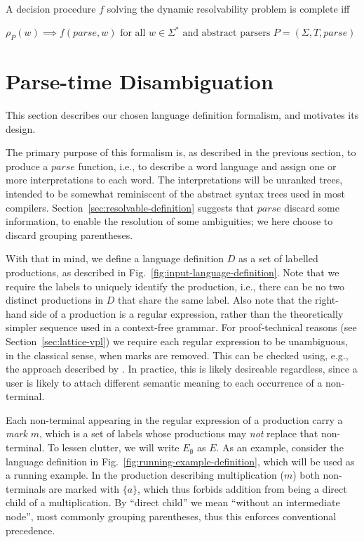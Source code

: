 \documentclass[acmsmall,review,anonymous]{acmart}\settopmatter{printfolios=true,printccs=false,printacmref=false}
\newcommand{\T}{\Sigma} %
\newcommand{\parse}{\mathit{parse}} %
\begin{document}
\begin{definition}
  A decision procedure $f$ solving the dynamic resolvability problem is complete iff

  $\rho_P(w) \implies f(\parse, w) \text{ for all } w \in \Sigma^{*} \text{ and abstract parsers } P = (\T, T, \parse)$
\end{definition}


\section{Parse-time Disambiguation} \label{sec:parse-time-disambiguation}

This section describes our chosen language definition formalism, and motivates its design.

The primary purpose of this formalism is, as described in the previous section, to produce a $\parse$ function, i.e., to describe a word language and assign one or more interpretations to each word. The interpretations will be unranked trees, intended to be somewhat reminiscent of the abstract syntax trees used in most compilers. Section~\ref{sec:resolvable-definition} suggests that $\parse$ discard some information, to enable the resolution of some ambiguities; we here choose to discard grouping parentheses.

With that in mind, we define a language definition $D$ as a set of labelled productions, as described in Fig.~\ref{fig:input-language-definition}. Note that we require the labels to uniquely identify the production, i.e., there can be no two distinct productions in $D$ that share the same label. Also note that the right-hand side of a production is a regular expression, rather than the theoretically simpler sequence used in a context-free grammar. For proof-technical reasons (see Section~\ref{sec:lattice-vpl}) we require each regular expression to be unambiguous, in the classical sense, when marks are removed. This can be checked using, e.g., the approach described by \citet{brabrandTypedUnambiguousPattern2010}. In practice, this is likely desireable regardless, since a user is likely to attach different semantic meaning to each occurrence of a non-terminal.

Each non-terminal appearing in the regular expression of a production carry a \emph{mark} $m$, which is a set of labels whose productions may \emph{not} replace that non-terminal. To lessen clutter, we will write $E_\emptyset$ as $E$. As an example, consider the language definition in Fig.~\ref{fig:running-example-definition}, which will be used as a running example. In the production describing multiplication ($m$) both non-terminals are marked with $\{a\}$, which thus forbids addition from being a direct child of a multiplication. By ``direct child'' we mean ``without an intermediate node'', most commonly grouping parentheses, thus this enforces conventional precedence.
\end{document}
